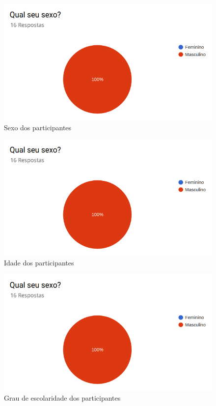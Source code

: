 \begin{figure}[!ht]
    \centering
    \includegraphics[scale=0.3]{./figuras/grafico_placeholder.png}
    \caption{Sexo dos participantes}
    \label{fig:grafico-sexo}
\end{figure}

\begin{figure}[!ht]
    \centering
    \includegraphics[scale=0.3]{./figuras/grafico_placeholder.png}
    \caption{Idade dos participantes}
    \label{fig:grafico-idade}
\end{figure}

\begin{figure}[!ht]
    \centering
    \includegraphics[scale=0.3]{./figuras/grafico_placeholder.png}
    \caption{Grau de escolaridade dos participantes}
    \label{fig:grafico-grau}
\end{figure}

